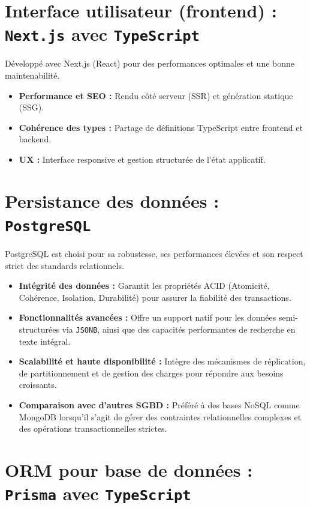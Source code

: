 \documentclass[12pt]{rapportPfe}
\begin{document}
\section{Interface utilisateur (frontend) : \texttt{Next.js} avec \texttt{TypeScript}}

Développé avec Next.js (React) pour des performances optimales et une bonne maintenabilité.

\begin{itemize}
    \item \textbf{Performance et SEO :} Rendu côté serveur (SSR) et génération statique (SSG).
    \item \textbf{Cohérence des types :} Partage de définitions TypeScript entre frontend et backend.
    \item \textbf{UX :} Interface responsive et gestion structurée de l’état applicatif.
\end{itemize}

\section{Persistance des données : \texttt{PostgreSQL}}

PostgreSQL est choisi pour sa robustesse, ses performances élevées et son respect strict des standards relationnels.

\begin{itemize}
    \item \textbf{Intégrité des données :} Garantit les propriétés ACID (Atomicité, Cohérence, Isolation, Durabilité) pour assurer la fiabilité des transactions.
    \item \textbf{Fonctionnalités avancées :} Offre un support natif pour les données semi-structurées via \texttt{JSONB}, ainsi que des capacités performantes de recherche en texte intégral.
    \item \textbf{Scalabilité et haute disponibilité :} Intègre des mécanismes de réplication, de partitionnement et de gestion des charges pour répondre aux besoins croissants.
    \item \textbf{Comparaison avec d’autres SGBD :} Préféré à des bases NoSQL comme MongoDB lorsqu’il s’agit de gérer des contraintes relationnelles complexes et des opérations transactionnelles strictes.
\end{itemize}

\section{ORM pour base de données : \texttt{Prisma} avec \texttt{TypeScript}}
\end{document}
